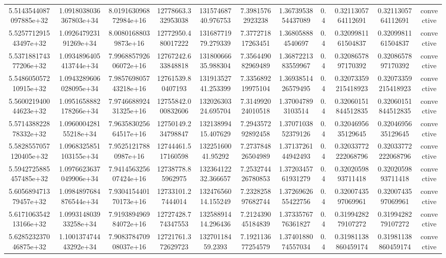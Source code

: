 \begin{table}
\begin{tabular}{ccccccccccc}
5.5143544087097885e+32 & 1.0918038036367803e+34 & 8.019163096872984e+16 & 12778663.332953038 & 13157468740.976753 & 7.39815762923238 & 1.3673953854437089 & 0.4 & 0.3211305764112691 & 0.3211305764112691 & convective \\
5.525771291543497e+32 & 1.092647923191269e+34 & 8.00801688039873e+16 & 12772950.480017222 & 13168771979.279339 & 7.377271817263451 & 1.368058884540697 & 0.4 & 0.3209981161504837 & 0.3209981161504837 & convective \\
5.537188174377206e+32 & 1.0934896405413744e+34 & 7.996885792606072e+16 & 12767242.633848818 & 13180066635.988304 & 7.356449082969489 & 1.3687221383559967 & 0.4 & 0.3208657897170392 & 0.3208657897170392 & convective \\
5.548605057210915e+32 & 1.0943289606028095e+34 & 7.985769805743218e+16 & 12761539.80407193 & 13191352741.253399 & 7.335689219975104 & 1.3693851426579495 & 0.4 & 0.32073359215418923 & 0.32073359215418923 & convective \\
5.560021940044623e+32 & 1.0951658882178266e+34 & 7.974668892431325e+16 & 12755842.000832606 & 13202630324.695704 & 7.314992024010518 & 1.370047893103514 & 0.4 & 0.32060151844512835 & 0.32060151844512835 & convective \\
5.571438822878332e+32 & 1.096000428155218e+34 & 7.963583025664517e+16 & 12750149.234798847 & 13213899415.407629 & 7.294357292892458 & 1.3707103852379126 & 0.4 & 0.3204695635129645 & 0.3204695635129645 & convective \\
5.5828557057120405e+32 & 1.0968325851103155e+34 & 7.95251217880987e+16 & 12744461.517160598 & 13225160041.95292 & 7.273784826504989 & 1.3713726144942493 & 0.4 & 0.32033772222068796 & 0.32033772222068796 & convective \\
5.5942725885457485e+32 & 1.0976623637049906e+34 & 7.941456325607424e+16 & 12738778.85962975 & 13236412232.366657 & 7.253274426780853 & 1.3720345761931279 & 0.4 & 0.3202059893711418 & 0.3202059893711418 & convective \\
5.605689471379457e+32 & 1.0984897684876544e+34 & 7.930415440170173e+16 & 12733101.27444014 & 13247656014.155249 & 7.232825897682744 & 1.3726962655422756 & 0.4 & 0.3200743597069961 & 0.3200743597069961 & convective \\
5.617106354213166e+32 & 1.099314803933258e+34 & 7.919389496984072e+16 & 12727428.774347553 & 13258891414.296436 & 7.212439045184839 & 1.3733576776361827 & 0.4 & 0.3199428279107272 & 0.3199428279107272 & convective \\
5.628523237046875e+32 & 1.100137474443292e+34 & 7.908378470908037e+16 & 12721761.372629723 & 13270118459.2393 & 7.192113677254579 & 1.3740188074557034 & 0.4 & 0.31981138860459174 & 0.31981138860459174 & convective \\

\end{tabular}
\end{table}
